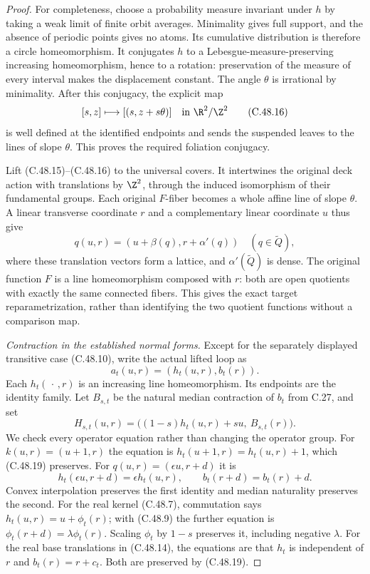 \begin{proof}
For completeness, choose a probability measure invariant
under $h$ by taking a weak limit of finite orbit averages.
Minimality gives full support, and the absence of periodic
points gives no atoms. Its cumulative distribution is
therefore a circle homeomorphism. It conjugates $h$ to a
Lebesgue-measure-preserving increasing homeomorphism,
hence to a rotation: preservation of the measure of
every interval makes the displacement constant.
The angle $\theta$ is irrational by minimality.
After this conjugacy, the explicit map
\[
              [s,z]\longmapsto[(s,z+s\theta)]
                         \quad\text{in }\R^2/\Z^2
                                                        \tag{C.48.16}
\]
is well defined at the identified endpoints and sends
the suspended leaves to the lines of slope $\theta$.
This proves the required foliation conjugacy.

Lift (C.48.15)--(C.48.16) to the universal covers. It
intertwines the original deck action with translations
by $\Z^2$, through the induced isomorphism of their
fundamental groups. Each original $F$-fiber becomes a
whole affine line of slope $\theta$. A linear transverse
coordinate $r$ and a complementary linear coordinate
$u$ thus give
\[
       q(u,r)=(u+\beta(q),r+\alpha'(q))\quad(q\in\widetilde Q),
                                                        \tag{C.48.17}
\]
where these translation vectors form a lattice, and
$\alpha'(\widetilde Q)$ is dense. The original function
$F$ is a line homeomorphism composed with $r$: both
are open quotients with exactly the same connected
fibers. This gives the exact target reparametrization,
rather than identifying the two quotient functions
without a comparison map.

\emph{Contraction in the established normal forms.}
Except for the separately displayed transitive case
(C.48.10), write the actual lifted loop as
\[
                 a_t(u,r)=(h_t(u,r),b_t(r)).             \tag{C.48.18}
\]
Each $h_t(\,\cdot\,,r)$ is an increasing line
homeomorphism. Its endpoints are the identity family.
Let $B_{s,t}$ be the natural median contraction of
$b_t$ from C.27, and set
\[
 H_{s,t}(u,r)=
       \bigl((1-s)h_t(u,r)+su,\ B_{s,t}(r)\bigr).
                                                        \tag{C.48.19}
\]
We check every operator equation rather than changing
the operator group. For $k(u,r)=(u+1,r)$ the equation
is $h_t(u+1,r)=h_t(u,r)+1$, which (C.48.19) preserves.
For $q(u,r)=(\epsilon u,r+d)$ it is
\[
 h_t(\epsilon u,r+d)=\epsilon h_t(u,r),\qquad
 b_t(r+d)=b_t(r)+d.
                                                        \tag{C.48.20}
\]
Convex interpolation preserves the first identity and
median naturality preserves the second.
For the real kernel (C.48.7), commutation says
$h_t(u,r)=u+\phi_t(r)$; with (C.48.9) the further
equation is $\phi_t(r+d)=\lambda\phi_t(r)$.
Scaling $\phi_t$ by $1-s$ preserves it, including
negative $\lambda$.
For the real base translations in (C.48.14), the
equations are that $h_t$ is independent of $r$ and
$b_t(r)=r+c_t$. Both are preserved by (C.48.19).


\end{proof}
